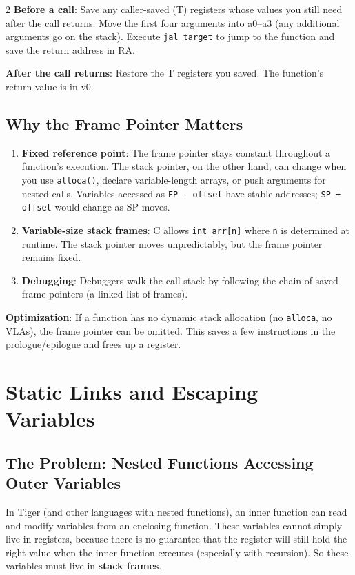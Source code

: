 \documentclass[9pt,landscape]{extarticle}
\begin{document}
\begin{multicols}{2}
\textbf{Before a call}: Save any caller-saved (T) registers whose values you still need after the call returns. Move the first four arguments into a0--a3 (any additional arguments go on the stack). Execute \texttt{jal target} to jump to the function and save the return address in RA.

\textbf{After the call returns}: Restore the T registers you saved. The function's return value is in v0.

\subsection{Why the Frame Pointer Matters}

\begin{enumerate}
  \item \textbf{Fixed reference point}: The frame pointer stays constant throughout a function's execution. The stack pointer, on the other hand, can change when you use \texttt{alloca()}, declare variable-length arrays, or push arguments for nested calls. Variables accessed as \texttt{FP - offset} have stable addresses; \texttt{SP + offset} would change as SP moves.
  \item \textbf{Variable-size stack frames}: C allows \texttt{int arr[n]} where \texttt{n} is determined at runtime. The stack pointer moves unpredictably, but the frame pointer remains fixed.
  \item \textbf{Debugging}: Debuggers walk the call stack by following the chain of saved frame pointers (a linked list of frames).
\end{enumerate}

\textbf{Optimization}: If a function has no dynamic stack allocation (no \texttt{alloca}, no VLAs), the frame pointer can be omitted. This saves a few instructions in the prologue/epilogue and frees up a register.

\section{Static Links and Escaping Variables}

\subsection{The Problem: Nested Functions Accessing Outer Variables}

In Tiger (and other languages with nested functions), an inner function can read and modify variables from an enclosing function. These variables cannot simply live in registers, because there is no guarantee that the register will still hold the right value when the inner function executes (especially with recursion). So these variables must live in \textbf{stack frames}.


\end{multicols}
\end{document}
